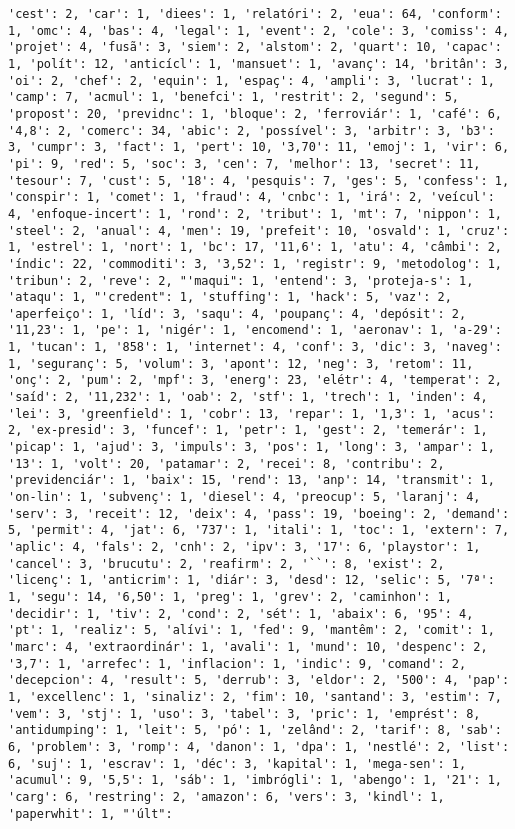 \documentclass[11pt]{article}
\begin{document}
\begin{Verbatim}[commandchars=\\\{\}]
'cest': 2, 'car': 1, 'diees': 1, 'relatóri': 2, 'eua': 64, 'conform': 1, 'omc': 4, 'bas': 4, 'legal': 1, 'event': 2, 'cole': 3, 'comiss': 4, 'projet': 4, 'fusã': 3, 'siem': 2, 'alstom': 2, 'quart': 10, 'capac': 1, 'polít': 12, 'anticícl': 1, 'mansuet': 1, 'avanç': 14, 'britân': 3, 'oi': 2, 'chef': 2, 'equin': 1, 'espaç': 4, 'ampli': 3, 'lucrat': 1, 'camp': 7, 'acmul': 1, 'benefci': 1, 'restrit': 2, 'segund': 5, 'propost': 20, 'previdnc': 1, 'bloque': 2, 'ferroviár': 1, 'café': 6, '4,8': 2, 'comerc': 34, 'abic': 2, 'possível': 3, 'arbitr': 3, 'b3': 3, 'cumpr': 3, 'fact': 1, 'pert': 10, '3,70': 11, 'emoj': 1, 'vir': 6, 'pi': 9, 'red': 5, 'soc': 3, 'cen': 7, 'melhor': 13, 'secret': 11, 'tesour': 7, 'cust': 5, '18': 4, 'pesquis': 7, 'ges': 5, 'confess': 1, 'conspir': 1, 'comet': 1, 'fraud': 4, 'cnbc': 1, 'irá': 2, 'veícul': 4, 'enfoque-incert': 1, 'rond': 2, 'tribut': 1, 'mt': 7, 'nippon': 1, 'steel': 2, 'anual': 4, 'men': 19, 'prefeit': 10, 'osvald': 1, 'cruz': 1, 'estrel': 1, 'nort': 1, 'bc': 17, '11,6': 1, 'atu': 4, 'câmbi': 2, 'índic': 22, 'commoditi': 3, '3,52': 1, 'registr': 9, 'metodolog': 1, 'tribun': 2, 'reve': 2, "'maqui": 1, 'entend': 3, 'proteja-s': 1, 'ataqu': 1, "'credent": 1, 'stuffing': 1, 'hack': 5, 'vaz': 2, 'aperfeiço': 1, 'líd': 3, 'saqu': 4, 'poupanç': 4, 'depósit': 2, '11,23': 1, 'pe': 1, 'nigér': 1, 'encomend': 1, 'aeronav': 1, 'a-29': 1, 'tucan': 1, '858': 1, 'internet': 4, 'conf': 3, 'dic': 3, 'naveg': 1, 'seguranç': 5, 'volum': 3, 'apont': 12, 'neg': 3, 'retom': 11, 'onç': 2, 'pum': 2, 'mpf': 3, 'energ': 23, 'elétr': 4, 'temperat': 2, 'saíd': 2, '11,232': 1, 'oab': 2, 'stf': 1, 'trech': 1, 'inden': 4, 'lei': 3, 'greenfield': 1, 'cobr': 13, 'repar': 1, '1,3': 1, 'acus': 2, 'ex-presid': 3, 'funcef': 1, 'petr': 1, 'gest': 2, 'temerár': 1, 'picap': 1, 'ajud': 3, 'impuls': 3, 'pos': 1, 'long': 3, 'ampar': 1, '13': 1, 'volt': 20, 'patamar': 2, 'recei': 8, 'contribu': 2, 'previdenciár': 1, 'baix': 15, 'rend': 13, 'anp': 14, 'transmit': 1, 'on-lin': 1, 'subvenç': 1, 'diesel': 4, 'preocup': 5, 'laranj': 4, 'serv': 3, 'receit': 12, 'deix': 4, 'pass': 19, 'boeing': 2, 'demand': 5, 'permit': 4, 'jat': 6, '737': 1, 'itali': 1, 'toc': 1, 'extern': 7, 'aplic': 4, 'fals': 2, 'cnh': 2, 'ipv': 3, '17': 6, 'playstor': 1, 'cancel': 3, 'brucutu': 2, 'reafirm': 2, '``': 8, 'exist': 2, 'licenç': 1, 'anticrim': 1, 'diár': 3, 'desd': 12, 'selic': 5, '7ª': 1, 'segu': 14, '6,50': 1, 'preg': 1, 'grev': 2, 'caminhon': 1, 'decidir': 1, 'tiv': 2, 'cond': 2, 'sét': 1, 'abaix': 6, '95': 4, 'pt': 1, 'realiz': 5, 'alívi': 1, 'fed': 9, 'mantêm': 2, 'comit': 1, 'marc': 4, 'extraordinár': 1, 'avali': 1, 'mund': 10, 'despenc': 2, '3,7': 1, 'arrefec': 1, 'inflacion': 1, 'indic': 9, 'comand': 2, 'decepcion': 4, 'result': 5, 'derrub': 3, 'eldor': 2, '500': 4, 'pap': 1, 'excellenc': 1, 'sinaliz': 2, 'fim': 10, 'santand': 3, 'estim': 7, 'vem': 3, 'stj': 1, 'uso': 3, 'tabel': 3, 'pric': 1, 'emprést': 8, 'antidumping': 1, 'leit': 5, 'pó': 1, 'zelând': 2, 'tarif': 8, 'sab': 6, 'problem': 3, 'romp': 4, 'danon': 1, 'dpa': 1, 'nestlé': 2, 'list': 6, 'suj': 1, 'escrav': 1, 'déc': 3, 'kapital': 1, 'mega-sen': 1, 'acumul': 9, '5,5': 1, 'sáb': 1, 'imbrógli': 1, 'abengo': 1, '21': 1, 'carg': 6, 'restring': 2, 'amazon': 6, 'vers': 3, 'kindl': 1, 'paperwhit': 1, "'últ": 
\end{Verbatim}
\end{document}
